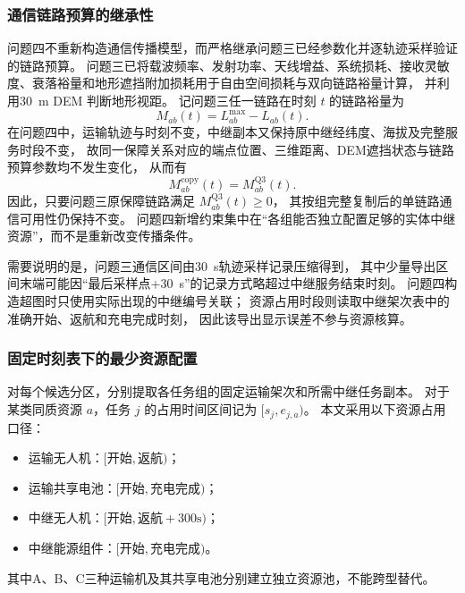 \subsubsection{通信链路预算的继承性}

问题四不重新构造通信传播模型，而严格继承问题三已经参数化并逐轨迹采样验证的链路预算。
问题三已将载波频率、发射功率、天线增益、系统损耗、接收灵敏度、衰落裕量和地形遮挡附加损耗用于自由空间损耗与双向链路裕量计算，
并利用30~m DEM 判断地形视距。
记问题三任一链路在时刻 $t$ 的链路裕量为
\begin{equation}
 M_{ab}(t)=L_{ab}^{\max}-L_{ab}(t).
 \label{eq:q4-margin-inherit}
\end{equation}
在问题四中，运输轨迹与时刻不变，中继副本又保持原中继经纬度、海拔及完整服务时段不变，
故同一保障关系对应的端点位置、三维距离、DEM遮挡状态与链路预算参数均不发生变化，
从而有
\begin{equation}
 M_{ab}^{\mathrm{copy}}(t)=M_{ab}^{\mathrm{Q3}}(t).
 \label{eq:q4-margin-equal}
\end{equation}
因此，只要问题三原保障链路满足 $M_{ab}^{\mathrm{Q3}}(t)\ge0$，
其按组完整复制后的单链路通信可用性仍保持不变。
问题四新增约束集中在“各组能否独立配置足够的实体中继资源”，而不是重新改变传播条件。

需要说明的是，问题三通信区间由30~s轨迹采样记录压缩得到，
其中少量导出区间末端可能因“最后采样点+30~s”的记录方式略超过中继服务结束时刻。
问题四构造超图时只使用实际出现的中继编号关联；
资源占用时段则读取中继架次表中的准确开始、返航和充电完成时刻，
因此该导出显示误差不参与资源核算。

\subsubsection{固定时刻表下的最少资源配置}

对每个候选分区，分别提取各任务组的固定运输架次和所需中继任务副本。
对于某类同质资源 $a$，任务 $j$ 的占用时间区间记为 $[s_j,e_{j,a})$。
本文采用以下资源占用口径：
\begin{itemize}
    \item 运输无人机：$[\text{开始},\text{返航})$；
    \item 运输共享电池：$[\text{开始},\text{充电完成})$；
    \item 中继无人机：$[\text{开始},\text{返航}+300\text{s})$；
    \item 中继能源组件：$[\text{开始},\text{充电完成})$。
\end{itemize}
其中A、B、C三种运输机及其共享电池分别建立独立资源池，不能跨型替代。

